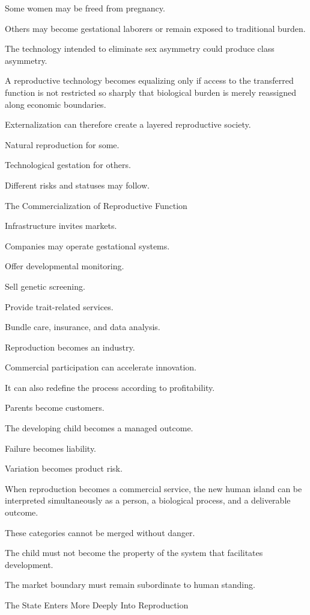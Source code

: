 Some women may be freed from pregnancy.

Others may become gestational laborers or remain exposed to traditional burden.

The technology intended to eliminate sex asymmetry could produce class asymmetry.

A reproductive technology becomes equalizing only if access to the transferred function is not restricted so sharply that biological burden is merely reassigned along economic boundaries.

Externalization can therefore create a layered reproductive society.

Natural reproduction for some.

Technological gestation for others.

Different risks and statuses may follow.

The Commercialization of Reproductive Function

Infrastructure invites markets.

Companies may operate gestational systems.

Offer developmental monitoring.

Sell genetic screening.

Provide trait-related services.

Bundle care, insurance, and data analysis.

Reproduction becomes an industry.

Commercial participation can accelerate innovation.

It can also redefine the process according to profitability.

Parents become customers.

The developing child becomes a managed outcome.

Failure becomes liability.

Variation becomes product risk.

When reproduction becomes a commercial service, the new human island can be interpreted simultaneously as a person, a biological process, and a deliverable outcome.

These categories cannot be merged without danger.

The child must not become the property of the system that facilitates development.

The market boundary must remain subordinate to human standing.

The State Enters More Deeply Into Reproduction

